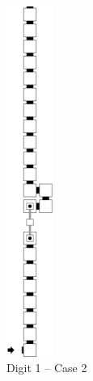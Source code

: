 \begin{itemize}
\begin{figure}[H]
\begin{subfigure}[t]{0.17\textwidth}
                \includegraphics[width=0.17\textwidth]{warping_post_warp_case2_digit1_msr}
                \caption{\label{fig:post_warp_case2_digit1_msr} Digit 1 -- Case 2}
            \end{subfigure}%
            ~
            \begin{subfigure}[t]{0.17\textwidth}
                \centering

\end{subfigure}
\end{figure}
\end{itemize}
